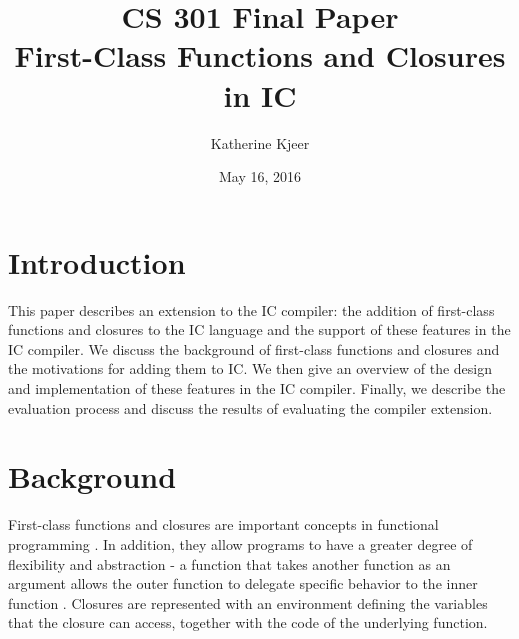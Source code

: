 \documentclass{article}
\title{CS 301 Final Paper\\First-Class Functions and Closures in IC}
\author{Katherine Kjeer}
\date{May 16, 2016}
\begin{document}
\maketitle

\section{Introduction}
\label{introduction}
This paper describes an extension to the IC compiler: the addition of first-class functions and closures to the IC language and the support of these features in the IC compiler. We discuss the background of first-class functions and closures and the motivations for adding them to IC. We then give an overview of the design and implementation of these features in the IC compiler. Finally, we describe the evaluation process and discuss the results of evaluating the compiler extension.

\section{Background}
\label{background}
First-class functions and closures are important concepts in functional programming \cite{learningscala}. In addition, they allow programs to have a greater degree of flexibility and abstraction - a function that takes another function as an argument allows the outer function to delegate specific behavior to the inner function \cite{practicalclojure}. Closures are represented with an environment defining the variables that the closure can access, together with the code of the underlying function.
\end{document}

